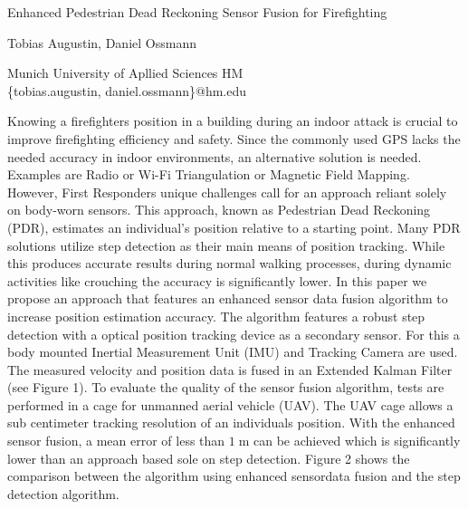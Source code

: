 \documentclass[10pt,a4paper]{article}
\begin{document}
	
	\Large
	\begin{center}
		Enhanced Pedestrian Dead Reckoning Sensor Fusion for Firefighting\\ 
		
		\hspace{10pt}
		
		\large
		Tobias Augustin, Daniel Ossmann \\
		
		\hspace{10pt}
		
		\small  
		Munich University of Apllied Sciences HM\\
		\{tobias.augustin, daniel.ossmann\}@hm.edu\\
		
		
	\end{center}
	
	\hspace{10pt}
	
	\normalsize
	
	Knowing a firefighters position in a building during an indoor attack is crucial to improve firefighting efficiency and safety. Since the commonly used GPS lacks the needed accuracy in indoor environments, an alternative solution is needed. Examples are Radio or Wi-Fi Triangulation or Magnetic Field Mapping. However, First Responders unique challenges call for an approach reliant solely on body-worn sensors. This approach, known as Pedestrian Dead Reckoning (PDR), estimates an individual's position relative to a starting point. Many PDR solutions utilize step detection as their main means of position tracking. While this produces accurate results during normal walking processes, during dynamic activities like crouching the accuracy is significantly lower. In this paper we propose an approach that features an enhanced sensor data fusion algorithm to increase position estimation accuracy. The algorithm features a robust step detection with a optical position tracking device as a secondary sensor. For this a body mounted Inertial Measurement Unit (IMU) and Tracking Camera are used. The measured velocity and position data is fused in an Extended Kalman Filter (see Figure 1). To evaluate the quality of the sensor fusion algorithm, tests are performed in a cage for unmanned aerial vehicle (UAV). The UAV cage allows a sub centimeter tracking resolution of an individuals position. With the enhanced sensor fusion, a mean error of less than $1\;\mathrm{m}$ can be achieved which is significantly lower than an approach based sole on step detection. Figure 2 shows the comparison between the algorithm using enhanced sensordata fusion and the step detection algorithm.
	\vspace{1cm}
	
\end{document}
